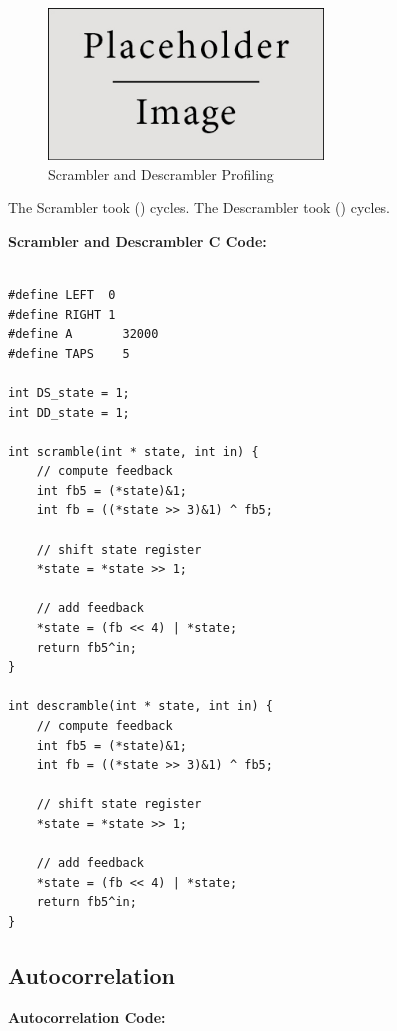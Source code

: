 \documentclass{article}
\begin{document}
\begin{figure}[h]
  \begin{center}
    \includegraphics[width=0.65\textwidth]{img/placeholder.jpg}
    \caption{Scrambler and Descrambler Profiling}
  \end{center}
\end{figure}

The Scrambler took () cycles.
The Descrambler took () cycles.
\newline

\textbf{Scrambler and Descrambler C Code:}

\begin{verbatim}

#define LEFT  0
#define RIGHT 1
#define A       32000
#define TAPS    5

int DS_state = 1;
int DD_state = 1;

int scramble(int * state, int in) {
    // compute feedback
    int fb5 = (*state)&1;
    int fb = ((*state >> 3)&1) ^ fb5;

    // shift state register
    *state = *state >> 1;

    // add feedback
    *state = (fb << 4) | *state;
    return fb5^in;
}

int descramble(int * state, int in) {
    // compute feedback
    int fb5 = (*state)&1;
    int fb = ((*state >> 3)&1) ^ fb5;

    // shift state register
    *state = *state >> 1;

    // add feedback
    *state = (fb << 4) | *state;
    return fb5^in;
}

\end{verbatim}

\subsection{Autocorrelation}

\textbf{Autocorrelation Code:}
\end{document}
